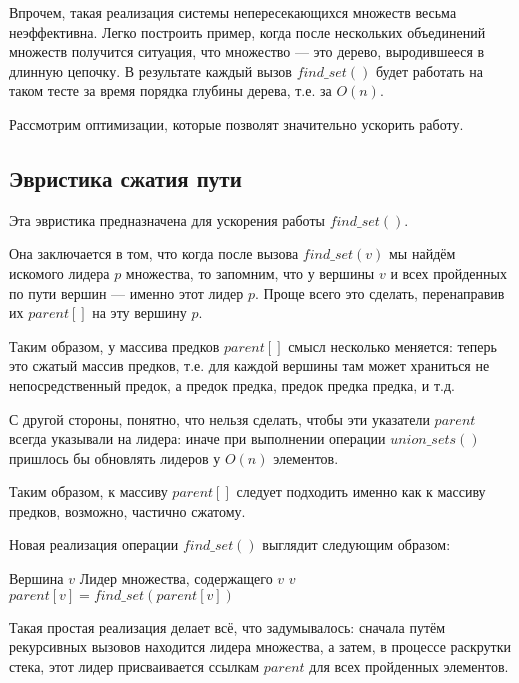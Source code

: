 \documentclass[a4paper,12pt]{article}
\begin{document}
Впрочем, такая реализация системы непересекающихся множеств весьма неэффективна. Легко построить пример, когда после нескольких объединений множеств получится ситуация, что множество — это дерево, выродившееся в длинную цепочку. В результате каждый вызов $ find\_set()$ будет работать на таком тесте за время порядка глубины дерева, т.е. за $O(n)$.

Рассмотрим оптимизации, которые позволят значительно ускорить работу.

\subsection{Эвристика сжатия пути}

Эта эвристика предназначена для ускорения работы $ find\_set()$.

Она заключается в том, что когда после вызова $find\_set(v)$ мы найдём искомого лидера $p$ множества, то запомним, что у вершины $v$ и всех пройденных по пути вершин — именно этот лидер $p$. Проще всего это сделать, перенаправив их $parent[]$ на эту вершину $p$.

Таким образом, у массива предков $parent[]$ смысл несколько меняется: теперь это сжатый массив предков, т.е. для каждой вершины там может храниться не непосредственный предок, а предок предка, предок предка предка, и т.д.

С другой стороны, понятно, что нельзя сделать, чтобы эти указатели $parent$ всегда указывали на лидера: иначе при выполнении операции $union\_sets()$ пришлось бы обновлять лидеров у $O(n)$ элементов.

Таким образом, к массиву $parent[]$ следует подходить именно как к массиву предков, возможно, частично сжатому.

Новая реализация операции $find\_set()$ выглядит следующим образом:

\begin{algorithm}
  	\caption{($v$)}
	\begin{algorithmic}
	    \Require Вершина $v$
	    \Ensure Лидер множества, содержащего $v$
	    \State
	        \State \Return $v$
	   \EndIf
	   \State \Return $parent[v] = find\_set(parent[v])$
	\end{algorithmic}
\end{algorithm}

Такая простая реализация делает всё, что задумывалось: сначала путём рекурсивных вызовов находится лидера множества, а затем, в процессе раскрутки стека, этот лидер присваивается ссылкам $parent$ для всех пройденных элементов.
\end{document}
